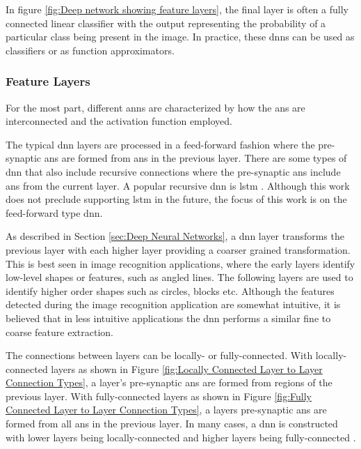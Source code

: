 In figure \ref{fig:Deep network showing feature layers}, the final layer is often a fully connected linear classifier with the output representing the probability of a particular class being present in the image.
In practice, these \acp{dnn} can be used as classifiers or as function approximators.

\iffalse
In practice, useful deep neural networks are very large and often exceed the capacity of single GPUs. Therefore,  there is opportunity for a solution that provides
real-time acceleration and storage of of these systems.
\fi


\subsubsection{Feature Layers}
\label{sec:Feature Layers}

For the most part, different \acp{ann} are characterized by how the \acp{an} are interconnected and the activation function employed.

The typical \ac{dnn} layers are processed in a feed-forward fashion where the pre-synaptic \acp{an} are formed from \acp{an} in the previous layer.
There are some types of \ac{dnn} that also include recursive connections where the pre-synaptic \acp{an} include \acp{an} from the current layer.
A popular recursive \ac{dnn} is \acf{lstm} \cite{hochreiter1997long}. Although this work does not preclude supporting \ac{lstm} in the future, the focus of this work is on the feed-forward type \ac{dnn}.

As described in Section \ref{sec:Deep Neural Networks}, a \ac{dnn} layer transforms the previous layer with each higher layer providing a coarser grained transformation. 
This is best seen in image recognition applications, where the early layers identify low-level shapes or features, such as angled lines. 
The following layers are used to identify higher order shapes such as circles, blocks etc. 
Although the features detected during the image recognition application are somewhat intuitive, it is believed that in less intuitive applications the \ac{dnn} performs a similar fine to coarse feature extraction.

The connections between layers can be locally- or fully-connected. 
With locally-connected layers as shown in Figure \ref{fig:Locally Connected Layer to Layer Connection Types}, a layer's pre-synaptic \acp{an} are formed from regions of the previous layer.
With fully-connected layers as shown in Figure \ref{fig:Fully Connected Layer to Layer Connection Types}, a layers pre-synaptic \acp{an} are formed from all \acp{an} in the previous layer.
In many cases, a \ac{dnn} is constructed with lower layers being locally-connected and higher layers being fully-connected \cite{krizhevsky2012imagenet}.

